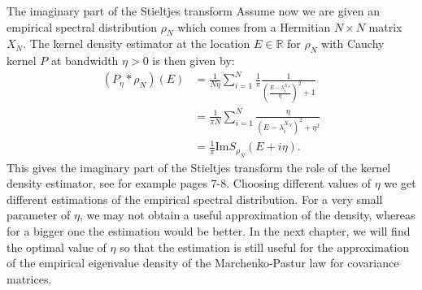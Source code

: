 \documentclass[11pt, a4paper, oneside]{book}
\numberwithin{equation}{chapter}
\begin{document}
\begin{section}{The imaginary part of the Stieltjes transform}
Assume now we are given an empirical spectral distribution $\rho_N$ which comes from a Hermitian $N \times N$ matrix $X_N.$ The kernel density estimator at the location $E \in \mathbb{R}$ for $\rho_N$ with Cauchy kernel $P$ at bandwidth $\eta > 0$ is then given by:
%
\begin{align*}
(P_\eta \ast \rho_N)(E) &= \frac{1}{N\eta} \sum \limits_{i=1}^N \frac{1}{\pi} \frac{1}{\left ( \frac{E - \lambda_i^{X_N}}{\eta} \right )^2 + 1} \\
&= \frac{1}{\pi N} \sum \limits_{i=1}^N \frac{\eta}{(E - \lambda_i^{X_N})^2 + \eta^2} \\
&= \frac{1}{\pi} \mathrm{Im} S_{\rho_N} (E+i\eta) .
\end{align*}
%
This gives the imaginary part of the Stieltjes transform the role of the kernel density estimator, see for example \cite{benaych2016lectures} pages 7-8. Choosing different values of $\eta$ we get different estimations of the empirical spectral distribution. For a very small parameter of $\eta$, we may not obtain a useful approximation of the density, whereas for a bigger one the estimation would be better. In the next chapter, we will find the optimal value of $\eta$ so that the estimation is still useful for the approximation of the empirical eigenvalue density of the Marchenko-Pastur law for covariance matrices.
\end{section}

\pagebreak
\end{document}
